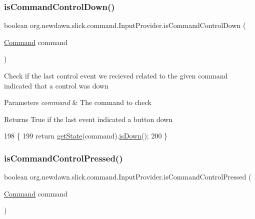\subsubsection{\texorpdfstring{is\+Command\+Control\+Down()}{isCommandControlDown()}}
{\footnotesize\ttfamily boolean org.\+newdawn.\+slick.\+command.\+Input\+Provider.\+is\+Command\+Control\+Down (\begin{DoxyParamCaption}\item[{\mbox{\hyperlink{interfaceorg_1_1newdawn_1_1slick_1_1command_1_1_command}{Command}}}]{command }\end{DoxyParamCaption})\hspace{0.3cm}{\ttfamily [inline]}}

Check if the last control event we recieved related to the given command indicated that a control was down


\begin{DoxyParams}{Parameters}
{\em command} & The command to check \\
\hline
\end{DoxyParams}
\begin{DoxyReturn}{Returns}
True if the last event indicated a button down 
\end{DoxyReturn}

\begin{DoxyCode}
198                                                          \{
199         \textcolor{keywordflow}{return} \mbox{\hyperlink{classorg_1_1newdawn_1_1slick_1_1command_1_1_input_provider_aa25975d0cc21a4d1a45995c553e72357}{getState}}(command).\mbox{\hyperlink{classorg_1_1newdawn_1_1slick_1_1command_1_1_input_provider_1_1_command_state_aa59f3f148709346d8722c652048fa2cc}{isDown}}();
200     \}
\end{DoxyCode}
\mbox{\label{classorg_1_1newdawn_1_1slick_1_1command_1_1_input_provider_a6d760d52392ef0a9d996d5a9dfe777b8}} 
\subsubsection{\texorpdfstring{is\+Command\+Control\+Pressed()}{isCommandControlPressed()}}
{\footnotesize\ttfamily boolean org.\+newdawn.\+slick.\+command.\+Input\+Provider.\+is\+Command\+Control\+Pressed (\begin{DoxyParamCaption}\item[{\mbox{\hyperlink{interfaceorg_1_1newdawn_1_1slick_1_1command_1_1_command}{Command}}}]{command }\end{DoxyParamCaption})\hspace{0.3cm}{\ttfamily [inline]}}

